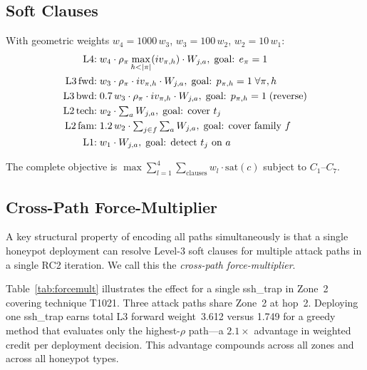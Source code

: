 \documentclass[journal]{IEEEtran}
\begin{document}
\subsection{Soft Clauses}
\label{sec:model:soft}

With geometric weights $w_4=1000\,w_3$, $w_3=100\,w_2$,
$w_2=10\,w_1$:
\begin{align}
  \text{L4:}& \; w_4\cdot\rho_\pi
    \max_{h<|\pi|}(iv_{\pi,h})\cdot W_{j,a}, \;
    \text{goal: }e_\pi=1 \label{eq:L4}\\
  \text{L3\,fwd:}& \; w_3\cdot\rho_\pi\cdot iv_{\pi,h}
    \cdot W_{j,a}, \;
    \text{goal: }p_{\pi,h}=1\;\forall\pi,h \label{eq:L3f}\\
  \text{L3\,bwd:}& \; 0.7\,w_3\cdot\rho_\pi\cdot iv_{\pi,h}
    \cdot W_{j,a}, \;
    \text{goal: }p_{\pi,h}=1\;\text{(reverse)} \label{eq:L3b}\\
  \text{L2\,tech:}& \; w_2\cdot\textstyle\sum_a W_{j,a}, \;
    \text{goal: cover }t_j \label{eq:L2t}\\
  \text{L2\,fam:}& \; 1.2\,w_2\cdot
    \textstyle\sum_{j\in f}\sum_a W_{j,a}, \;
    \text{goal: cover family }f \label{eq:L2f}\\
  \text{L1:}& \; w_1\cdot W_{j,a}, \;
    \text{goal: detect }t_j\text{ on }a \label{eq:L1}
\end{align}

The complete objective is
$\max\sum_{l=1}^{4}\sum_\text{clauses}w_l\cdot\mathrm{sat}(c)$
subject to $C_1$--$C_7$.

\subsection{Cross-Path Force-Multiplier}
\label{sec:forcemult}

A key structural property of encoding all paths simultaneously is
that a single honeypot deployment can resolve Level-3 soft clauses
for multiple attack paths in a single RC2 iteration. We call this the
\emph{cross-path force-multiplier}.

Table~\ref{tab:forcemult} illustrates the effect for a single
ssh\_trap in Zone~2 covering technique T1021. Three attack paths
share Zone~2 at hop~2. Deploying one ssh\_trap earns total L3
forward weight~3.612 versus 1.749 for a greedy method that evaluates
only the highest-$\rho$ path---a $2.1\times$ advantage in weighted
credit per deployment decision. This advantage compounds across
all zones and across all honeypot types.
\end{document}
